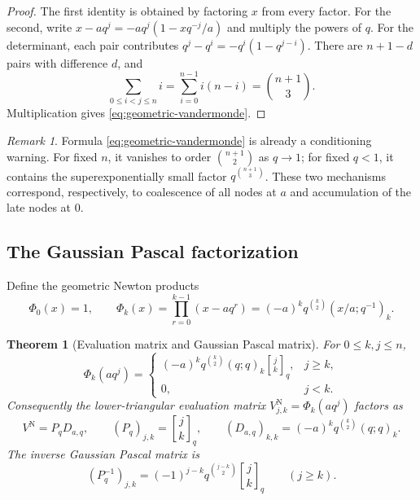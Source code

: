 \documentclass[11pt,a4paper,oneside]{article}
\newtheorem{theorem}{Theorem}[section]
\theoremstyle{definition}
\theoremstyle{remark}
\newtheorem{remark}[remark]{Remark}
\newcommand{\qbinom}[3]{\genfrac{[}{]}{0pt}{}{#1}{#2}_{#3}}
\begin{document}
\begin{proof}
The first identity is obtained by factoring $x$ from every factor.  For the
second, write
$x-aq^j=-aq^j(1-xq^{-j}/a)$ and multiply the powers of $q$.
For the determinant, each pair contributes
$q^j-q^i=-q^i(1-q^{j-i})$.  There are $n+1-d$ pairs with difference $d$, and
\[
 \sum_{0\le i<j\le n}i
 =\sum_{i=0}^{n-1}i(n-i)=\binom{n+1}{3}.
\]
Multiplication gives \eqref{eq:geometric-vandermonde}.
\end{proof}

\begin{remark}
Formula \eqref{eq:geometric-vandermonde} is already a conditioning warning.
For fixed $n$, it vanishes to order $\binom{n+1}{2}$ as $q\to1$; for fixed
$q<1$, it contains the superexponentially small factor
$q^{\binom{n+1}{3}}$.  These two mechanisms correspond, respectively, to
coalescence of all nodes at $a$ and accumulation of the late nodes at $0$.
\end{remark}

\subsection{The Gaussian Pascal factorization}

Define the geometric Newton products
\begin{equation}
 \Phi_0(x)=1,
 \qquad
 \Phi_k(x)=\prod_{r=0}^{k-1}(x-aq^r)
 =(-a)^kq^{\binom k2}(x/a;q^{-1})_k.
 \label{eq:newton-products}
\end{equation}

\begin{theorem}[Evaluation matrix and Gaussian Pascal matrix]
\label{thm:pascal-factorization}
For $0\le k,j\le n$,
\begin{equation}
 \Phi_k(aq^j)=
 \begin{cases}
 (-a)^kq^{\binom k2}(q;q)_k\qbinom jkq,&j\ge k,\\
 0,&j<k.
 \end{cases}
 \label{eq:newton-evaluation}
\end{equation}
Consequently the lower-triangular evaluation matrix
$V^{\mathrm N}_{j,k}=\Phi_k(aq^j)$ factors as
\begin{equation}
 V^{\mathrm N}=P_qD_{a,q},
 \qquad
 (P_q)_{j,k}=\qbinom jkq,
 \qquad
 (D_{a,q})_{k,k}=(-a)^kq^{\binom k2}(q;q)_k.
 \label{eq:pascal-matrix-factorization}
\end{equation}
The inverse Gaussian Pascal matrix is
\begin{equation}
 (P_q^{-1})_{j,k}
 =(-1)^{j-k}q^{\binom{j-k}{2}}\qbinom jkq
 \qquad (j\ge k).
 \label{eq:q-pascal-inverse}
\end{equation}
\end{theorem}
\end{document}
